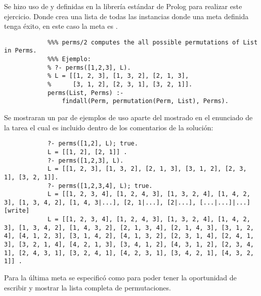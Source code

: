 \begin{enumerate}
    \begin{solution}
        Se hizo uso de  y  definidas en la librería estándar de Prolog para realizar este ejercicio. Donde  crea una lista de todas las instancias donde una meta definida tenga éxito, en este caso la meta es .
        \begin{verbatim}
            %%% perms/2 computes the all possible permutations of List in Perms.
            %%% Ejemplo:
            % ?- perms([1,2,3], L).
            % L = [[1, 2, 3], [1, 3, 2], [2, 1, 3], 
            %      [3, 1, 2], [2, 3, 1], [3, 2, 1]].
            perms(List, Perms) :-
                findall(Perm, permutation(Perm, List), Perms).
        \end{verbatim}
        Se mostraran un par de ejemplos de uso aparte del mostrado en el enunciado de la tarea el cual es incluido dentro de los comentarios de la solución:
        \begin{verbatim}
            ?- perms([1,2], L); true.
            L = [[1, 2], [2, 1]] .
            ?- perms([1,2,3], L).
            L = [[1, 2, 3], [1, 3, 2], [2, 1, 3], [3, 1, 2], [2, 3, 1], [3, 2, 1]].
            ?- perms([1,2,3,4], L); true.
            L = [[1, 2, 3, 4], [1, 2, 4, 3], [1, 3, 2, 4], [1, 4, 2, 3], [1, 3, 4, 2], [1, 4, 3|...], [2, 1|...], [2|...], [...|...]|...] [write]
            L = [[1, 2, 3, 4], [1, 2, 4, 3], [1, 3, 2, 4], [1, 4, 2, 3], [1, 3, 4, 2], [1, 4, 3, 2], [2, 1, 3, 4], [2, 1, 4, 3], [3, 1, 2, 4], [4, 1, 2, 3], [3, 1, 4, 2], [4, 1, 3, 2], [2, 3, 1, 4], [2, 4, 1, 3], [3, 2, 1, 4], [4, 2, 1, 3], [3, 4, 1, 2], [4, 3, 1, 2], [2, 3, 4, 1], [2, 4, 3, 1], [3, 2, 4, 1], [4, 2, 3, 1], [3, 4, 2, 1], [4, 3, 2, 1]] .
        \end{verbatim}
        Para la última meta se especificó como  para poder tener la oportunidad de escribir  y mostrar la lista completa de permutaciones.
    \end{solution}
\end{enumerate}





